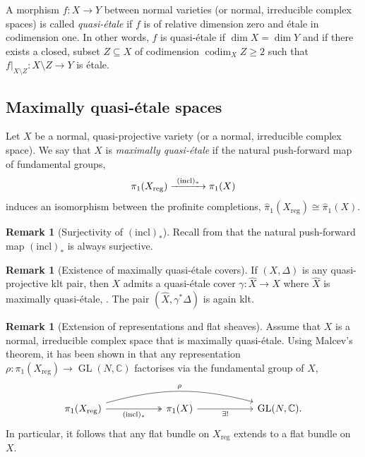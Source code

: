 \documentclass[JEP,XML,SOM,Unicode,published]{cedram}
\newcommand{\To}[1]{\mathchoice{\xrightarrow{\ts\kern4pt#1\kern3pt}}{\stackrel{#1}{\longrightarrow}}{}{}}
\let\ts\relax
\theoremstyle{plain}
\theoremstyle{definition}
\newtheorem{rem}[thm]{Remark}
\numberwithin{equation}{thm}
\numberwithin{enumi}{thm}
\DeclareMathOperator{\codim}{codim}
\newcommand{\reg}{\mathrm{reg}}
\DeclareMathOperator{\GL}{GL}
\newcommand{\bC}{\mathbb{C}}
\let\what\widehat
\begin{document}
A morphism $f : X \to Y$ between normal varieties (or normal, irreducible complex
spaces) is called \emph{quasi-étale} if $f$ is of relative dimension zero and
étale in codimension one. In other words, $f$ is quasi-étale if
$\dim X = \dim Y$ and if there exists a closed, subset $Z \subseteq X$ of codimension
$\codim_X Z \geq 2$ such that $f|_{X \setminus Z} : X \setminus Z \to Y$ is étale.

\subsection{Maximally quasi-étale spaces}
\label{ssec:mqes}

Let $X$ be a normal, quasi-projective variety (or a normal, irreducible complex
space). We say that $X$ is \emph{maximally quasi-étale} if the natural
push-forward map of fundamental groups,
\[
\pi_1(X_{\reg}) \To{(\text{incl})_*} \pi_1(X)
\]
induces an isomorphism between the profinite completions,
$\what{\pi}_1(X_{\reg}) \cong \what{\pi}_1(X)$.

\begin{rem}[Surjectivity of $(\text{incl})_*$]
Recall from \cite[0.7.B on p.\,33]{FL81} that the natural push-forward map
$(\text{incl})_*$ is always surjective.
\end{rem}

\begin{rem}[Existence of maximally quasi-étale covers]
If $(X,\Delta)$ is any quasi-projective klt pair, then $X$ admits a quasi-étale
cover $\gamma : \what{X} \to X$ where $\what{X}$ is maximally quasi-étale,
\cite[Th.\,1.14]{GKP13}. The pair $(\what{X}, \gamma^*\Delta)$ is again klt.
\end{rem}

\begin{rem}[Extension of representations and flat sheaves]\label{rem:extrep}
Assume that $X$ is a normal, irreducible complex space that is maximally
quasi-étale. Using Malcev's theorem, it has been shown in
\cite[\S 8.1]{GKP13} that any representation $\rho : \pi_1(X_{\reg}) \to \GL(N,\bC)$
factorises via the fundamental group of $X$,
\[
\begin{tikzcd}[column sep=2cm]
\pi_1(X_{\reg}) \ar[r, two heads, "\ts(\text{incl})_*"'] \ar[rr, bend left=15, "\ts\rho"] & \pi_1(X) \ar[r, "\ts\exists !"'] & \GL(N,\bC).
\end{tikzcd}
\]
In particular, it follows that any flat bundle on $X_{\reg}$ extends to a flat
bundle on $X$.
\end{rem}
\end{document}
